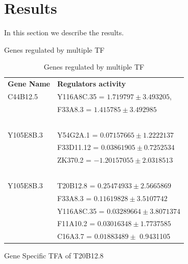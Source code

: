 \documentclass[12pt]{article}
\begin{document}
\section{Results}\label{results}
In this section we describe the results.

Genes regulated by multiple TF
        \begin{table} [ht]
	  \begin{tabular}{l l }
	      \textbf{Gene Name} & \textbf{Regulators activity} \\
	      {\color{red}C44B12.5} & {\color{blue} Y116A8C.35 }= $ 1.719797 \pm 3.493205 $, \\ 
				    & {\color{blue}F33A8.3} = $ 1.415785 \pm 3.492985$ \\~\\

		{\color{red}Y105E8B.3} & {\color{blue} Y54G2A.1} = $ 0.07157665 \pm 1.2222137 $ \\
		  & {\color{blue} F33D11.12} = $ 0.03861905 \pm 0.7252534 $ \\
 		  & {\color{blue} ZK370.2} = $ -1.20157055 \pm  2.0318513 $\\~\\
		    
	      {\color{red} Y105E8B.3} & {\color{blue} T20B12.8 } = $ 0.25474933 \pm  2.5665869 $ \\
		  			& {\color{blue} F33A8.3 } = $ 0.11619828  \pm  3.5107742 $ \\
 		  			& {\color{blue} Y116A8C.35 } = $ 0.03289664 \pm  3.8071374 $ \\
					& {\color{blue} F11A10.2 } = $ 0.03016348 \pm 1.7737585 $ \\
 		  			& {\color{blue} C16A3.7  } = $ 0.01883489 \pm  $ 0.9431105\\

	  \end{tabular}
	  \caption{Genes regulated by multiple TF}
	  \end{table}


      Gene Specific TFA of T20B12.8
    
\end{document}

